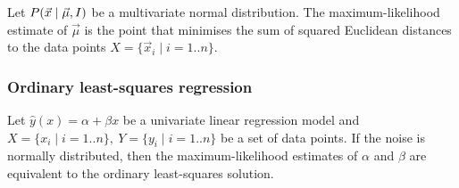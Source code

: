 \begin{thm}
  Let $P(\vec{x} \mid \vec{\mu}, I)$ be a multivariate normal
  distribution.
  The maximum-likelihood estimate of $\vec{\mu}$ is the point that minimises
  the sum of squared Euclidean distances to the data points
  $X = \{ \vec{x}_i \mid i = 1 .. n \}$.
\end{thm}

\subsubsection{Ordinary least-squares regression}

\begin{thm}
  Let $\hat{y}(x) = \alpha + \beta x$ be a univariate linear regression model
  and $X = \{ x_i \mid i = 1 .. n \},\ Y = \{ y_i \mid i = 1 .. n \}$ be a set of
  data points.
  If the noise is normally distributed, then the maximum-likelihood estimates of
  $\alpha$ and $\beta$ are equivalent to the ordinary least-squares solution.


\end{thm}
